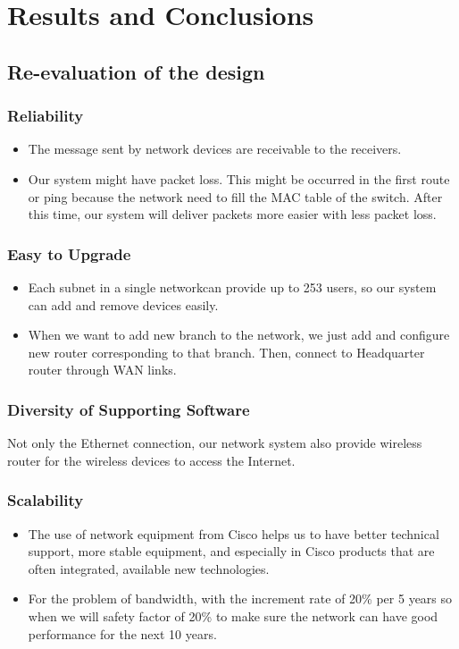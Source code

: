 \section{Results and Conclusions}
\subsection{Re-evaluation of the design}
\subsubsection{Reliability}
\begin{itemize}
    \item The message sent by network devices are receivable to the receivers.
    \item Our system might have packet loss. This might be occurred in the first route or ping because the network need to fill the MAC table of the switch. After this time, our system will deliver packets more easier with less packet loss.
\end{itemize}

\subsubsection{Easy to Upgrade}
\begin{itemize}
    \item Each subnet in a single networkcan provide up to 253 users, so our system can add and remove devices easily.
    \item When we want to add new branch to the network, we just add and configure new router corresponding to that branch. Then, connect to Headquarter router through WAN links.
\end{itemize}

\subsubsection{Diversity of Supporting Software}
Not only the Ethernet connection, our network system also provide wireless router for the wireless devices to access the Internet.

\subsubsection{Scalability}
\begin{itemize} 
        \item The use of network equipment from Cisco 
helps us to have better technical support, more stable equipment, and especially in
Cisco products that are often integrated, available new technologies.
    \item For the problem of bandwidth, with the increment rate of 20\% per 5 years so when we will safety factor of 20\% to make sure the network can have good performance for the next 10 years.
\end{itemize}

